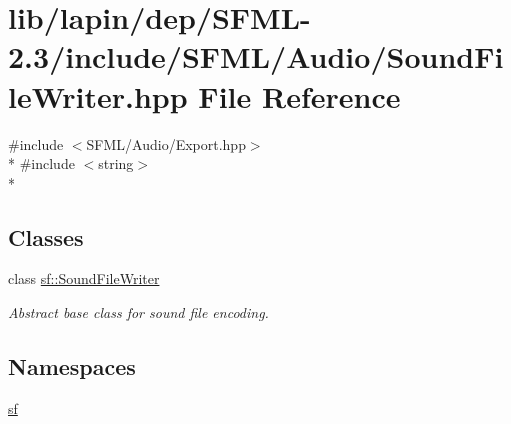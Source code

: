 \hypertarget{lapin_2dep_2_s_f_m_l-2_83_2include_2_s_f_m_l_2_audio_2_sound_file_writer_8hpp}{\section{lib/lapin/dep/\-S\-F\-M\-L-\/2.3/include/\-S\-F\-M\-L/\-Audio/\-Sound\-File\-Writer.hpp File Reference}
\label{lapin_2dep_2_s_f_m_l-2_83_2include_2_s_f_m_l_2_audio_2_sound_file_writer_8hpp}
}
{\ttfamily \#include $<$S\-F\-M\-L/\-Audio/\-Export.\-hpp$>$}\\*
{\ttfamily \#include $<$string$>$}\\*
\subsection*{Classes}
\begin{DoxyCompactItemize}
\item 
class \hyperlink{classsf_1_1_sound_file_writer}{sf\-::\-Sound\-File\-Writer}
\begin{DoxyCompactList}\small\item\em Abstract base class for sound file encoding. \end{DoxyCompactList}\end{DoxyCompactItemize}
\subsection*{Namespaces}
\begin{DoxyCompactItemize}
\item 
\hyperlink{namespacesf}{sf}
\end{DoxyCompactItemize}
